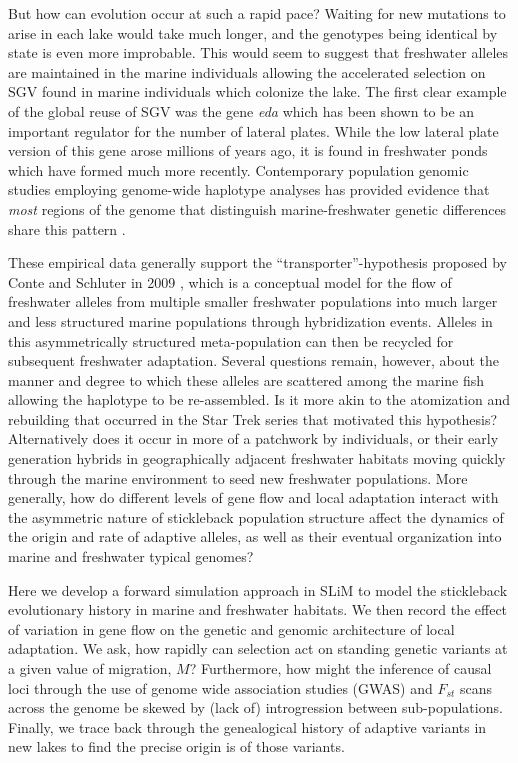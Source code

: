 \documentclass{article}
\begin{document}
But how can evolution occur at such a rapid pace? 
Waiting for new mutations to arise in each lake would take much longer, and the genotypes being identical by state is even more improbable. 
This would seem to suggest that freshwater alleles are maintained in the marine individuals allowing the accelerated selection on SGV found in marine individuals which colonize the lake. 
The first clear example of the global reuse of SGV was the gene \textit{eda} which has been shown to be an important regulator for the number of lateral plates. 
While the low lateral plate version of this gene arose millions of years ago, it is found in freshwater ponds which have formed much more recently. 
Contemporary population genomic studies employing genome-wide haplotype analyses has provided evidence that \textit{most} regions of the genome that distinguish marine-freshwater genetic differences share this pattern \citep{nelson2017ancient}. 
 
These empirical data generally support the ``transporter''-hypothesis proposed by Conte and Schluter in 2009 \citet{schluter2009genetics}, 
which is a conceptual model for the flow of freshwater alleles from multiple smaller freshwater populations into much larger and less structured marine populations through hybridization events. 
Alleles in this asymmetrically structured meta-population can then be recycled for subsequent freshwater adaptation. 
Several questions remain, however, about the manner and degree to which these alleles are scattered among the marine fish allowing the haplotype to be re-assembled. 
Is it more akin to the atomization and rebuilding that occurred in the Star Trek series that motivated this hypothesis? 
Alternatively does it occur in more of a patchwork by individuals, 
or their early generation hybrids in geographically adjacent freshwater habitats moving quickly through the marine environment to seed new freshwater populations. 
More generally, how do different levels of gene flow and local adaptation interact with the asymmetric nature of stickleback population structure affect the dynamics of the origin and rate of adaptive alleles, 
as well as their eventual organization into marine and freshwater typical genomes? 

Here we develop a forward simulation approach in SLiM to model the stickleback evolutionary history in marine and freshwater habitats.
We then record the effect of variation in gene flow on the genetic and genomic architecture of local adaptation.
We ask, how rapidly can selection act on standing genetic variants at a given value of migration, $M$?
Furthermore, how might the inference of causal loci through the use of genome wide association studies (GWAS) and $F_{st}$ scans across the genome be skewed by (lack of) introgression between sub-populations. 
Finally, we trace back through the genealogical history of adaptive variants in new lakes to find the precise origin is of those variants.
\end{document}
